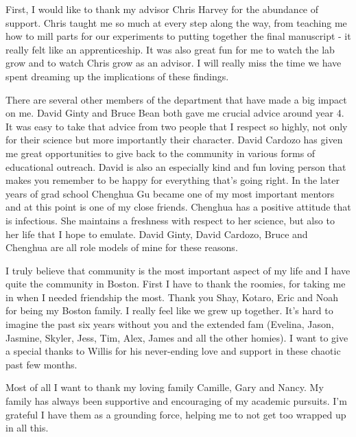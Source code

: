 
First, I would like to thank my advisor Chris Harvey for the abundance of support. Chris taught me so much at every step along the way, from teaching me how to mill parts for our experiments to putting together the final manuscript - it really felt like an apprenticeship. It was also great fun for me to watch the lab grow and to watch Chris grow as an advisor. I will really miss the time we have spent dreaming up the implications of these findings.

\bigskip

There are several other members of the department that have made a big impact on me. David Ginty and Bruce Bean both gave me crucial advice around year 4. It was easy to take that advice from two people that I respect so highly, not only for their science but more importantly their character. David Cardozo has given me great opportunities to give back to the community in various forms of educational outreach. David is also an especially kind and fun loving person that makes you remember to be happy for everything that's going right. In the later years of grad school Chenghua Gu became one of my most important mentors and at this point is one of my close friends. Chenghua has a positive attitude that is infectious. She maintains a freshness with respect to her science, but also to her life that I hope to emulate. David Ginty, David Cardozo, Bruce and Chenghua are all role models of mine for these reasons.

\bigskip

I truly believe that community is the most important aspect of my life and I have quite the community in Boston. First I have to thank the roomies, for taking me in when I needed friendship the most. Thank you Shay, Kotaro, Eric and Noah for being my Boston family. I really feel like we grew up together. It's hard to imagine the past six years without you and the extended fam (Evelina, Jason, Jasmine, Skyler, Jess, Tim, Alex, James and all the other homies). I want to give a special thanks to Willis for his never-ending love and support in these chaotic past few months.

\bigskip

Most of all I want to thank my loving family Camille, Gary and Nancy. My family has always been supportive and encouraging of my academic pursuits. I'm grateful I have them as a grounding force, helping me to not get too wrapped up in all this.